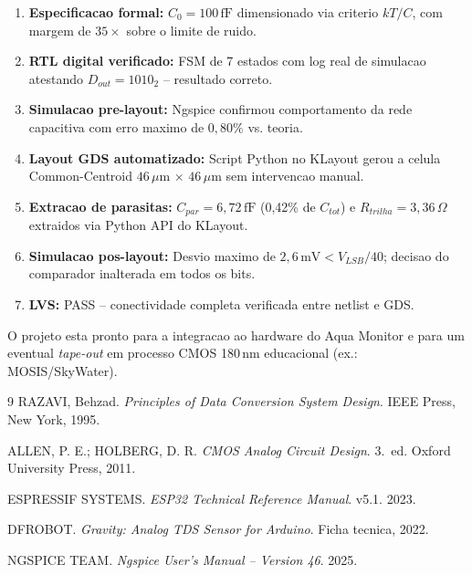 \documentclass[12pt, a4paper]{article}
\begin{document}
\begin{enumerate}
  \item \textbf{Especificacao formal:} $C_0 = 100\,\text{fF}$ dimensionado via criterio $kT/C$,
        com margem de $35\times$ sobre o limite de ruido.
  \item \textbf{RTL digital verificado:} FSM de 7 estados com log real de simulacao
        atestando $D_{out} = 1010_2$ -- resultado correto.
  \item \textbf{Simulacao pre-layout:} Ngspice confirmou comportamento da rede capacitiva
        com erro maximo de $0{,}80\%$ vs. teoria.
  \item \textbf{Layout GDS automatizado:} Script Python no KLayout gerou a celula
        Common-Centroid $46\,\mu$m $\times$ $46\,\mu$m sem intervencao manual.
  \item \textbf{Extracao de parasitas:} $C_{par} = 6{,}72\,\text{fF}$ (0{,}42\% de $C_{tot}$)
        e $R_{trilha} = 3{,}36\,\Omega$ extraidos via Python API do KLayout.
  \item \textbf{Simulacao pos-layout:} Desvio maximo de $2{,}6\,\text{mV} < V_{LSB}/40$;
        decisao do comparador inalterada em todos os bits.
  \item \textbf{LVS:} PASS -- conectividade completa verificada entre netlist e GDS.
\end{enumerate}

O projeto esta pronto para a integracao ao hardware do Aqua Monitor e para um eventual
\textit{tape-out} em processo CMOS 180\,nm educacional (ex.: MOSIS/SkyWater).

\renewcommand{\refname}{Referencias Bibliograficas}
\begin{thebibliography}{9}
RAZAVI, Behzad. \textit{Principles of Data Conversion System Design}. IEEE Press, New York, 1995.

ALLEN, P. E.; HOLBERG, D. R. \textit{CMOS Analog Circuit Design}. 3.~ed. Oxford University Press, 2011.

ESPRESSIF SYSTEMS. \textit{ESP32 Technical Reference Manual}. v5.1. 2023.

DFROBOT. \textit{Gravity: Analog TDS Sensor for Arduino}. Ficha tecnica, 2022.

NGSPICE TEAM. \textit{Ngspice User's Manual -- Version 46}. 2025.
\end{thebibliography}
\end{document}
